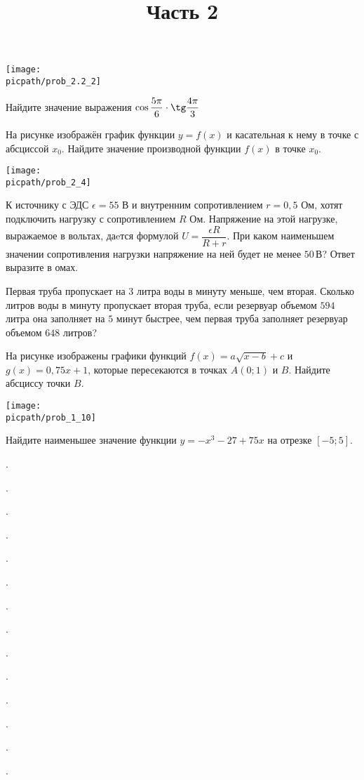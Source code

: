 \begin{training}[1]
\begin{listofex}[resume]
\begin{center}
			\texttt{[image: \\picpath/prob\_2.2\_2]}
		\end{center}
		\item Найдите значение выражения \( \cos\dfrac{5\pi}{6}\cdot\tg\dfrac{4\pi}{3} \)
		\foranswer
		\item
		На рисунке изображён график функции \( y=f(x) \) и касательная к нему в точке с абсциссой \( x_0 \). Найдите значение производной функции \( f(x) \) в точке \( x_0 \).
		\begin{center}
			\texttt{[image: \\picpath/prob\_2\_4]}
		\end{center}
		\foranswer
		\item К источнику с ЭДС \( \epsilon=55 \) В и внутренним сопротивлением \( r=0,5 \) Ом, хотят подключить нагрузку с сопротивлением \( R \) Ом. Напряжение на этой нагрузке, выражаемое в вольтах, даeтся формулой \( U=\dfrac{\epsilon R}{R+r} \).  При каком наименьшем значении сопротивления нагрузки напряжение на ней будет не менее \( 50 \) В? Ответ выразите в омах.
		\foranswer
		\item Первая труба пропускает на \( 3 \) литра воды в минуту меньше,
		чем вторая. Сколько литров воды в минуту пропускает вторая труба,
		если резервуар объемом \( 594 \) литра она заполняет на \( 5 \) минут быстрее,
		чем первая труба заполняет резервуар объемом \( 648 \) литров?
		\foranswer
		\newpage
		\hphantom{Часть 1}
		\item 
		На рисунке изображены графики функций \( f(x) = a\sqrt{x-b}+c \) и \( g(x) = 0,75x+1 \),
		которые пересекаются в точках \( A(0;1) \) и \( B \). Найдите абсциссу точки \( B \).
		\begin{center}
			\texttt{[image: \\picpath/prob\_1\_10]}
		\end{center}
		\foranswer
		\item Найдите наименьшее значение функции \( y=-x^3-27+75x \) на отрезке \( [-5;5] \).
		\foranswer
		\item .
		\item .
		\item .
		\item .
		\item .
		\item .
		\item .
		\item .
		\title{Часть 2}
		\item .
		\item .
		\item .
		\item .
		\item .
		\item .
	\end{listofex}
\end{training}

